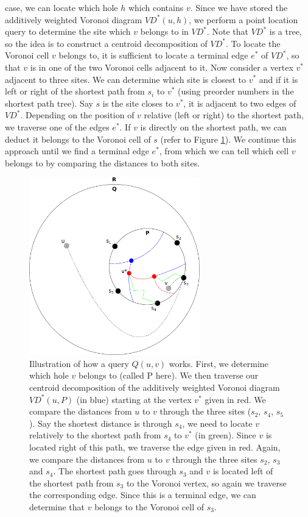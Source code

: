 case, we can locate which hole $h$ which contains $v$. Since we have stored the
additively weighted Voronoi diagram $VD^*(u,h)$, we perform a point location query to
determine the site which $v$ belongs to in $VD^*$. Note that
$VD^*$ is a tree, so the idea is to construct a centroid decomposition of $VD^*$. To locate the
Voronoi cell $v$ belongs to, it is sufficient to locate a terminal edge $e^*$ of $VD^*$, so that
$v$ is in one of the two Voronoi cells adjacent to it. Now consider a vertex $v^*$
adjacent to three sites. We can determine which site is closest to $v^*$ and if it is
left or right of the shortest path from $s_i$ to $v^*$ (using preorder numbers in the
shortest path tree). Say $s$ is the site closes to $v^*$, it is adjacent to two edges of
$VD^*$. Depending on the position of $v$ relative (left or right) to the shortest path,
we traverse one of the edges $e^*$. If $v$ is directly on the shortest path, we can
deduct it belongs to the Voronoi cell of $s$ (refer to Figure \ref{vd1}). We continue this approach until we find a
terminal edge $e^*$, from which we can tell which cell $v$ belongs to by comparing the
distances to both sites.

\begin{figure}[h!]
  \centering
  \includegraphics[width=0.66\textwidth]{figs/vd1.pdf}
  \caption{Illustration of how a query $Q(u,v)$ works. First, we determine which hole $v$
  belongs to (called P here). We then traverse our centroid decomposition of the
  additively weighted Voronoi diagram $VD^*(u,P)$ (in blue) starting at the vertex $v^*$ given in
red. We compare the distances from $u$ to $v$ through the three sites ($s_2$, $s_4$,
$s_5$). Say the shortest distance is through $s_4$, we need to locate $v$ relatively to
the shortest path from $s_4$ to $v^*$ (in green). Since $v$ is
located right of this path, we traverse the edge given in red. Again, we compare the
distances from $u$ to $v$ through the three sites $s_2$, $s_3$ and $s_4$. The shortest
path goes through $s_3$ and $v$ is located left of the shortest path from $s_3$ to the
Voronoi vertex, so again we traverse the corresponding edge. Since this is a terminal
edge, we can determine that $v$ belongs to the Voronoi cell of $s_3$.}
    \label{vd1}
\end{figure}

